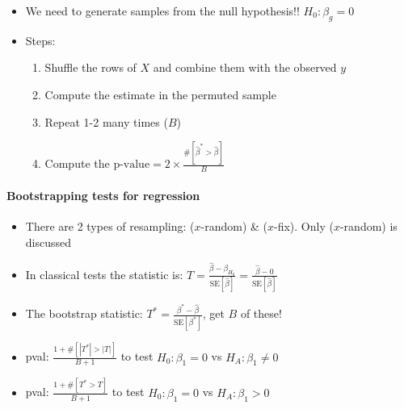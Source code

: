 \documentclass[]{article}
\providecommand{\tightlist}{%
  \setlength{\itemsep}{0pt}\setlength{\parskip}{0pt}}
\let\oldparagraph\paragraph
\renewcommand{\paragraph}[1]{\oldparagraph{#1}\mbox{}}
\begin{document}
\begin{itemize}
\tightlist
\item
  We need to generate samples from the null hypothesis!!
  \(H_0: \beta_g=0\)
\item
  Steps:

  \begin{enumerate}
  \def\labelenumi{\arabic{enumi}.}
  \tightlist
  \item
    Shuffle the rows of \(X\) and combine them with the observed \(y\)
  \item
    Compute the estimate in the permuted sample
  \item
    Repeat 1-2 many times (\(B\))
  \item
    Compute the
    \(\text{p-value}=2 \times \frac{\#[\hat{\beta}^*> \hat{\beta}]}{B}\)
  \end{enumerate}
\end{itemize}

\hypertarget{bootstrapping-tests-for-regression}{%
\paragraph{Bootstrapping tests for
regression}\label{bootstrapping-tests-for-regression}}

\begin{itemize}
\tightlist
\item
  There are 2 types of resampling: (\(x\)-random) \& (\(x\)-fix). Only
  (\(x\)-random) is discussed\\
\item
  In classical tests the statistic is:
  \(T=\frac{\hat{\beta}-\beta_{H_0}}{\text{SE}[\hat{\beta}]}=\frac{\hat{\beta}-0}{\text{SE}[\hat{\beta}]}\)\\
\item
  The bootstrap statistic:
  \(T^*=\frac{\beta^*-\hat{\beta}}{\text{SE}[\beta^*]}\), get \(B\) of
  these!\\
\item
  pval: \(\frac{1+\#[|T^*| > |T|]}{B+1}\) to test \(H_0:\beta_1=0\) vs
  \(H_A: \beta_1 \neq 0\)\\
\item
  pval: \(\frac{1+\#[T^* > T]}{B+1}\) to test \(H_0:\beta_1=0\) vs
  \(H_A: \beta_1 > 0\)
\end{itemize}
\end{document}
